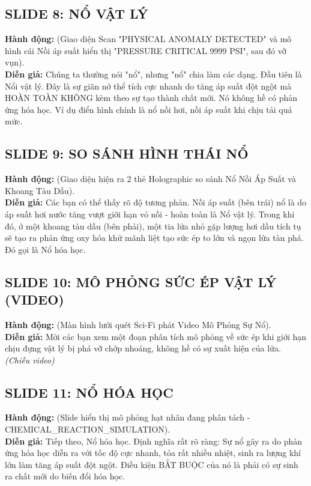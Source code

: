 \documentclass[13pt,a4paper]{article}
\begin{document}
\subsection*{SLIDE 8: NỔ VẬT LÝ}
\textbf{Hành động:} (Giao diện Scan "PHYSICAL ANOMALY DETECTED" và mô hình cái Nồi áp suất hiển thị "PRESSURE CRITICAL 9999 PSI", sau đó vỡ vụn).\\
\textbf{Diễn giả:} Chúng ta thường nói "nổ", nhưng "nổ" chia làm các dạng. Đầu tiên là Nổi vật lý. Đây là sự giãn nở thể tích cực nhanh do tăng áp suất đột ngột mà HOÀN TOÀN KHÔNG kèm theo sự tạo thành chất mới. Nó không hề có phản ứng hóa học. Ví dụ điển hình chính là nổ nồi hơi, nồi áp suất khi chịu tải quá mức.

\subsection*{SLIDE 9: SO SÁNH HÌNH THÁI NỔ}
\textbf{Hành động:} (Giao diện hiện ra 2 thẻ Holographic so sánh Nổ Nồi Áp Suất và Khoang Tàu Dầu).\\
\textbf{Diễn giả:} Các bạn có thể thấy rõ độ tương phản. Nồi áp suất (bên trái) nổ là do áp suất hơi nước tăng vượt giới hạn vỏ nồi - hoàn toàn là Nổ vật lý. Trong khi đó, ở một khoang tàu dầu (bên phải), một tia lửa nhỏ gặp lượng hơi dầu tích tụ sẽ tạo ra phản ứng oxy hóa khử mãnh liệt tạo sức ép to lớn và ngọn lửa tàn phá. Đó gọi là Nổ hóa học.

\subsection*{SLIDE 10: MÔ PHỎNG SỨC ÉP VẬT LÝ (VIDEO)}
\textbf{Hành động:} (Màn hình lưới quét Sci-Fi phát Video Mô Phỏng Sự Nổ).\\
\textbf{Diễn giả:} Mời các bạn xem một đoạn phân tích mô phỏng về sức ép khi giới hạn chịu đựng vật lý bị phá vỡ chớp nhoáng, không hề có sự xuất hiện của lửa. \textit{(Chiếu video)}

\subsection*{SLIDE 11: NỔ HÓA HỌC}
\textbf{Hành động:} (Slide hiển thị mô phỏng hạt nhân đang phân tách - CHEMICAL\_REACTION\_SIMULATION).\\
\textbf{Diễn giả:} Tiếp theo, Nổ hóa học. Định nghĩa rất rõ ràng: Sự nổ gây ra do phản ứng hóa học diễn ra với tốc độ cực nhanh, tỏa rất nhiều nhiệt, sinh ra lượng khí lớn làm tăng áp suất đột ngột. Điều kiện BẮT BUỘC của nó là phải có sự sinh ra chất mới do biến đổi hóa học.
\end{document}
